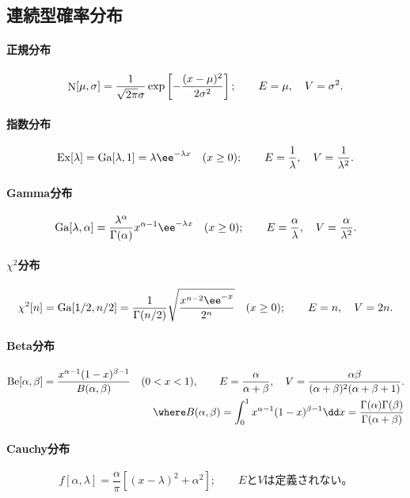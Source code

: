 \subsection{連続型確率分布}
\paragraph{正規分布}
\begin{equation}
 \mathop{\mathrm{N}}[\mu,\sigma]=\frac{1}{\sqrt{2\pi}\sigma}\exp\left[-\frac{(x-\mu)^2}{2\sigma^2}\right];
  \qquad E=\mu,\quad V=\sigma^2.
\end{equation}
\paragraph{指数分布}
\begin{equation}
 \func{Ex}[\lambda]=\func{Ga}[\lambda,1]=
\lambda\ee^{-\lambda x}\quad(x\ge0);
  \qquad E=\frac1\lambda,\quad V=\frac1{\lambda^2}.
\end{equation}
\paragraph{Gamma分布}
\begin{equation}
 \func{Ga}[\lambda,\alpha]=\frac{\lambda^\alpha}{\Gamma(\alpha)}x^{\alpha-1}\ee^{-\lambda x}\quad(x\ge0);
  \qquad E=\frac{\alpha}{\lambda},\quad V=\frac{\alpha}{\lambda^2}.
\end{equation}
\paragraph{$\chi^2$分布}
\begin{equation}
 \func{\chi^2}[n]=\func{Ga}[1/2,n/2]=\frac{1}{\Gamma(n/2)}
\sqrt{\frac{x^{n-2}\ee^{-x}}{2^n}}
\quad(x\ge0);
  \qquad E=n,\quad V=2n.
\end{equation}
\paragraph{Beta分布}
\begin{align}
  \func{Be}[\alpha,\beta]=\frac{x^{\alpha-1}(1-x)^{\beta-1}}{B(\alpha,\beta)}
\quad(0<x<1),
  \qquad E=\frac{\alpha}{\alpha+\beta},\quad V=\frac{\alpha\beta}{(\alpha+\beta)^2(\alpha+\beta+1)}.
\\
\where B(\alpha,\beta)=\int_0^1x^{\alpha-1}(1-x)^{\beta-1}\dd x=\frac{\Gamma(\alpha)\Gamma(\beta)}{\Gamma(\alpha+\beta)}
\end{align}
\paragraph{Cauchy分布}
\begin{equation}
 f[\alpha,\lambda]=\frac{\alpha}{\pi}\left[(x-\lambda)^2+\alpha^2\right];\qquad
  \text{$E$と$V$は定義されない。}
\end{equation}
